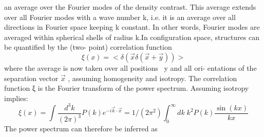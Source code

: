 \begin{description}
	an average over the Fourier modes of the density contrast. This
	average extends over all Fourier modes with a wave number k,
	i.e. it is an average over all directions in Fourier space keeping
	k constant. In other words, Fourier modes are averaged within
	spherical shells of radius k.In configuration space, structures can be quantified by the (two-
	point) correlation function
	\[\xi(x) = <\delta(\vec{x} \delta(\vec{x}+\vec{y}))>\]
	where the average is now taken over all positions ~y and all ori-
	entations of the separation vector $\vec{x}$ , assuming homogeneity and
	isotropy. The correlation function ξ is the Fourier transform of
	the power spectrum. Assuming isotropy implies:
	\[ \xi(x) = \int \frac{d^3 k}{(2\pi)^3} P(k) e^{-i \vec{k}\cdot \vec{x}} =  1/(2 \pi^2) \int_0^{\infty} dk\; k^2 P(k) \frac{\sin(kx)}{kx}\]
	The power spectrum can therefore be inferred as
	

\end{description}
